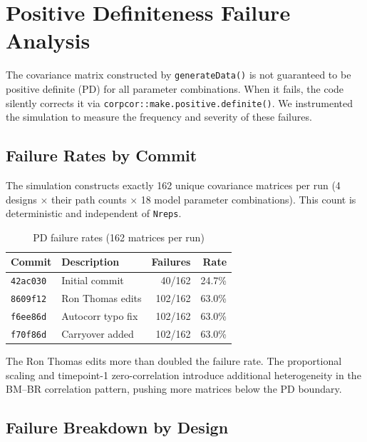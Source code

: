 \documentclass[11pt]{article}
\begin{document}
\section{Positive Definiteness Failure Analysis}

The covariance matrix constructed by \texttt{generateData()}
is not guaranteed to be positive definite (PD) for all parameter
combinations. When it fails, the code silently corrects it via
\texttt{corpcor::make.positive.definite()}. We instrumented the
simulation to measure the frequency and severity of these
failures.

\subsection{Failure Rates by Commit}

The simulation constructs exactly 162 unique covariance matrices
per run (4 designs $\times$ their path counts $\times$ 18 model
parameter combinations). This count is deterministic and
independent of \texttt{Nreps}.

\begin{table}[h]
\centering
\caption{PD failure rates (162 matrices per run)}
\begin{tabular}{llrr}
\toprule
Commit & Description & Failures & Rate \\
\midrule
\texttt{42ac030} & Initial commit &
  40/162 & 24.7\% \\
\texttt{8609f12} & Ron Thomas edits &
  102/162 & 63.0\% \\
\texttt{f6ee86d} & Autocorr typo fix &
  102/162 & 63.0\% \\
\texttt{f70f86d} & Carryover added &
  102/162 & 63.0\% \\
\bottomrule
\end{tabular}
\label{tab:pd_rates}
\end{table}

The Ron Thomas edits more than doubled the failure rate.
The proportional scaling and timepoint-1 zero-correlation
introduce additional heterogeneity in the BM--BR correlation
pattern, pushing more matrices below the PD boundary.

\subsection{Failure Breakdown by Design}
\end{document}
